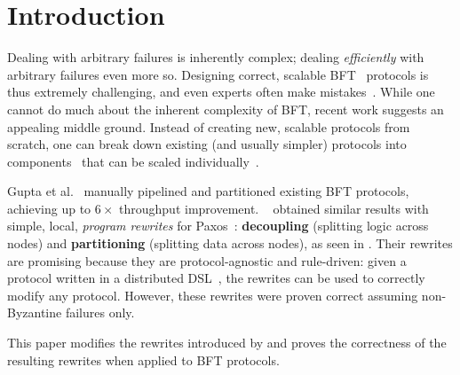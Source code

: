 \section{Introduction}
\label{sec:intro}
Dealing with arbitrary failures is inherently complex; dealing \emph{efficiently} with arbitrary failures even more so. 
Designing correct, scalable BFT~\cite{byzantineGenerals} protocols is thus extremely challenging, and even experts often make mistakes~\cite{zyzzyvaBug, protocolBugsList}.
While one cannot do much about the inherent complexity of BFT, recent work suggests an appealing middle ground.
Instead of creating new, scalable protocols from scratch, one can break down existing (and usually simpler)
protocols into components~\cite{chemistryBehindAgreement} that can be scaled individually~\cite{compartmentalized}.

Gupta et al.~\cite{resilientdb} manually pipelined and partitioned existing BFT protocols, achieving up to $6\times$ throughput improvement.
\sigmodpaper{}~\cite{autocomp} obtained similar results with simple, local, \emph{program rewrites} for Paxos~\cite{paxosComplex}: \textbf{decoupling} (splitting logic across nodes) and \textbf{partitioning} (splitting data across nodes), as seen in .
Their rewrites are promising because they are protocol-agnostic and rule-driven: given a protocol written in a distributed DSL~\cite{dedalus}, the rewrites can be used to correctly modify any protocol.
However, these rewrites were proven correct assuming non-Byzantine failures only.

This paper modifies the rewrites introduced by \sigmodpaper{} and proves the correctness of the resulting rewrites when applied to BFT protocols.

